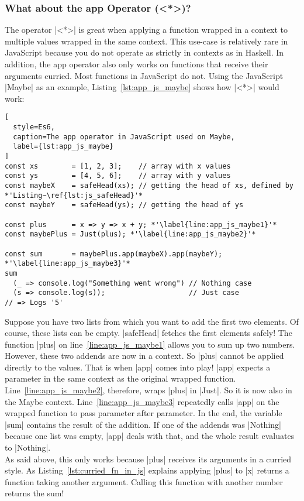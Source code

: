 \subsubsection{What about the app Operator (<*>)?} %
\label{subsub:Which operations do not fit JavaScript?}
The operator |<*>| is great when applying a function wrapped in a context to
multiple values wrapped in the same context. This use-case is relatively rare
in JavaScript because you do not operate as strictly in contexts as in Haskell.
In addition, the app operator also only works on functions that receive their
arguments curried. Most functions in JavaScript do not. Using the JavaScript
|Maybe| as an example, Listing~\ref{lst:app_js_maybe} shows how |<*>| would
work:

\begin{lstlisting}[
  style=Es6,
  caption=The app operator in JavaScript used on Maybe,
  label={lst:app_js_maybe}
]
const xs        = [1, 2, 3];    // array with x values
const ys        = [4, 5, 6];    // array with y values
const maybeX    = safeHead(xs); // getting the head of xs, defined by *'Listing~\ref{lst:js_safeHead}'*
const maybeY    = safeHead(ys); // getting the head of ys

const plus      = x => y => x + y; *'\label{line:app_js_maybe1}'*
const maybePlus = Just(plus); *'\label{line:app_js_maybe2}'*

const sum       = maybePlus.app(maybeX).app(maybeY); *'\label{line:app_js_maybe3}'*
sum 
  (_ => console.log("Something went wrong") // Nothing case
  (s => console.log(s));                    // Just case 
// => Logs '5'
\end{lstlisting}
Suppose you have two lists from which you want to add the first two elements.
Of course, these lists can be empty. |safeHead| fetches the first elements
safely! The function |plus| on line~\ref{line:app_js_maybe1} allows you to sum
up two numbers. However, these two addends are now in a context. So |plus|
cannot be applied directly to the values. That is when |app| comes into play!
|app| expects a parameter in the same context as the original wrapped function.
Line~\ref{line:app_js_maybe2}, therefore, wraps |plus| in |Just|. So it is
now also in the Maybe context. Line~\ref{line:app_js_maybe3} repeatedly calls
|app| on the wrapped function to pass parameter after parameter. In the end,
the variable |sum| contains the result of the addition. If one of the addends
was |Nothing| because one list was empty, |app| deals with that, and the whole
result evaluates to |Nothing|. \\ 
As said above, this only works because |plus| receives its arguments in a
curried style. As Listing~\ref{lst:curried_fn_in_js} explains applying |plus| to |x| returns a
function taking another argument. Calling this function with another number
returns the sum!

